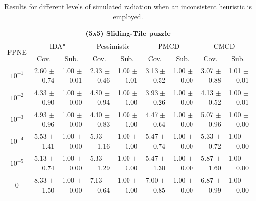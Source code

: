 \documentclass[letterpaper]{article}
\begin{document}
\begin{table}[t]
\centering
\setlength{\tabcolsep}{5 pt}
\begin{adjustbox}{width=0.65\columnwidth}
\begin{tabular}{| c | r  r | r  r | r  r | r  r |}
\hline
\multicolumn{9}{|c|}{\textbf{(5x5) Sliding-Tile puzzle}} \\
\hline
\multirow{2}{*}{FPNE}	& \multicolumn{2}{|c|}{IDA*} 	& \multicolumn{2}{|c|}{Pessimistic} 	& \multicolumn{2}{|c|}{PMCD} 	& \multicolumn{2}{|c|}{CMCD} 	\\
\cline{2-9}
	& \multicolumn{1}{c}{Cov.} & \multicolumn{1}{c|}{Sub.} 	& \multicolumn{1}{c}{Cov.} & \multicolumn{1}{c|}{Sub.} 	& \multicolumn{1}{c}{Cov.} & \multicolumn{1}{c|}{Sub.} 	& \multicolumn{1}{c}{Cov.} & \multicolumn{1}{c|}{Sub.} 	\\
\hline
$10^{-1}$	 & 2.60 $\pm$ 0.74	 & 1.00 $\pm$ 0.01	 & 2.93 $\pm$ 0.46	 & 1.00 $\pm$ 0.01	 & 3.13 $\pm$ 0.52	 & 1.00 $\pm$ 0.00	 & 3.07 $\pm$ 0.88	 & 1.01 $\pm$ 0.01	\\
$10^{-2}$	 & 4.33 $\pm$ 0.90	 & 1.00 $\pm$ 0.00	 & 4.80 $\pm$ 0.94	 & 1.00 $\pm$ 0.00	 & 3.93 $\pm$ 0.26	 & 1.00 $\pm$ 0.00	 & 4.13 $\pm$ 0.52	 & 1.00 $\pm$ 0.01	\\
$10^{-3}$	 & 4.93 $\pm$ 0.96	 & 1.00 $\pm$ 0.00	 & 4.40 $\pm$ 0.83	 & 1.00 $\pm$ 0.00	 & 4.47 $\pm$ 0.64	 & 1.00 $\pm$ 0.00	 & 5.07 $\pm$ 0.96	 & 1.00 $\pm$ 0.00	\\
$10^{-4}$	 & 5.53 $\pm$ 1.41	 & 1.00 $\pm$ 0.00	 & 5.93 $\pm$ 1.16	 & 1.00 $\pm$ 0.00	 & 5.47 $\pm$ 0.74	 & 1.00 $\pm$ 0.00	 & 5.33 $\pm$ 0.72	 & 1.00 $\pm$ 0.00	\\
$10^{-5}$	 & 5.13 $\pm$ 0.74	 & 1.00 $\pm$ 0.00	 & 5.33 $\pm$ 1.29	 & 1.00 $\pm$ 0.00	 & 5.47 $\pm$ 1.30	 & 1.00 $\pm$ 0.00	 & 5.87 $\pm$ 1.60	 & 1.00 $\pm$ 0.00	\\
0 	 & 8.33 $\pm$ 1.50	 & 1.00 $\pm$ 0.00 	 & 7.13 $\pm$ 0.64	 & 1.00 $\pm$ 0.00 	 & 7.00 $\pm$ 0.85	 & 1.00 $\pm$ 0.00 	 & 6.87 $\pm$ 0.99	 & 1.00 $\pm$ 0.00 	\\
\hline
\end{tabular}
\end{adjustbox}
\caption{Results for different levels of simulated radiation when an inconsistent heuristic is employed.}
\label{tab:24puzzle}
\end{table}
\end{document}
